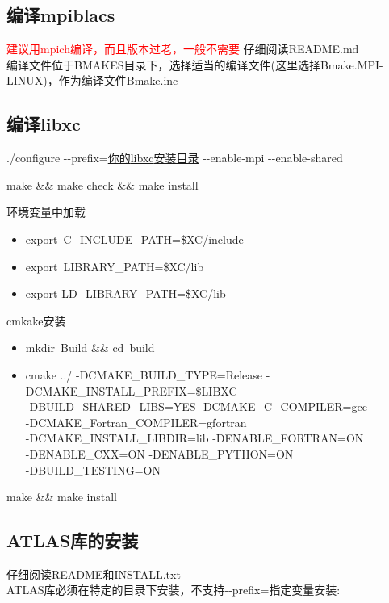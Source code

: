 \documentclass[10pt,a4paper]{article}
\begin{document}
\subsection{编译{\rm mpiblacs}}
\textcolor{red}{建议用mpich编译，而且版本过老，一般不需要}
仔细阅读\textrm{README.md}%
\\编译文件位于\textrm{BMAKES}目录下，选择适当的编译文件(这里选择\textrm{Bmake.MPI-LINUX})，作为编译文件\textrm{Bmake.inc}

\subsection{编译{\rm libxc}}
./configure -\/-prefix=\underline{你的\textrm{libxc}安装目录} -\/-enable-mpi -\/-enable-shared

make \&\& make check \&\& make install

环境变量中加载 %
\begin{itemize}
	\item \textrm{export~C\_INCLUDE\_PATH=\$XC/include}
	\item \textrm{export~LIBRARY\_PATH=\$XC/lib}
	\item \textrm{export LD\_LIBRARY_PATH=\$XC/lib}
\end{itemize}

\textrm{cmkake}安装
\begin{itemize}
	\item \textrm{mkdir~Build \&\& cd~build}
	\item cmake ../ -DCMAKE\_BUILD\_TYPE=Release -DCMAKE\_INSTALL\_PREFIX=\$LIBXC \\
-DBUILD\_SHARED\_LIBS=YES -DCMAKE\_C\_COMPILER=gcc \\
-DCMAKE\_Fortran\_COMPILER=gfortran \\
-DCMAKE\_INSTALL\_LIBDIR=lib -DENABLE\_FORTRAN=ON \\
-DENABLE\_CXX=ON -DENABLE\_PYTHON=ON \\
-DBUILD\_TESTING=ON
\end{itemize}
\item make \&\& make install
\subsection{{\rm ATLAS库的安装}}
仔细阅读\textrm{README}和\textrm{INSTALL.txt}\\

\textrm{ATLAS}库必须在特定的目录下安装，不支持\textrm{-\/-prefix=}指定变量安装:\\
\end{document}
